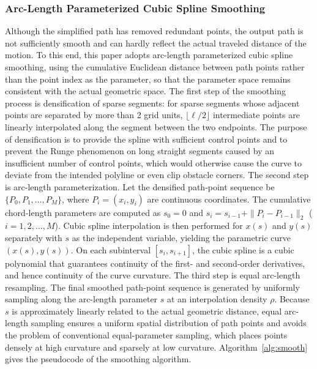 \documentclass[pdflatex,sn-basic,Numbered]{sn-jnl}
\begin{document}
\subsubsection{Arc-Length Parameterized Cubic Spline Smoothing}

Although the simplified path has removed redundant points, the output path is not sufficiently smooth and can hardly reflect the actual traveled distance of the motion. To this end, this paper adopts arc-length parameterized cubic spline smoothing, using the cumulative Euclidean distance between path points rather than the point index as the parameter, so that the parameter space remains consistent with the actual geometric space. The first step of the smoothing process is densification of sparse segments: for sparse segments whose adjacent points are separated by more than 2 grid units, $\lfloor \ell / 2 \rfloor$ intermediate points are linearly interpolated along the segment between the two endpoints. The purpose of densification is to provide the spline with sufficient control points and to prevent the Runge phenomenon on long straight segments caused by an insufficient number of control points, which would otherwise cause the curve to deviate from the intended polyline or even clip obstacle corners. The second step is arc-length parameterization. Let the densified path-point sequence be $\{P_0, P_1, \ldots, P_M\}$, where $P_i = (x_i, y_i)$ are continuous coordinates. The cumulative chord-length parameters are computed as $s_0 = 0$ and $s_i = s_{i-1} + \|P_i - P_{i-1}\|_2$ ($i = 1, 2, \ldots, M$). Cubic spline interpolation is then performed for $x(s)$ and $y(s)$ separately with $s$ as the independent variable, yielding the parametric curve $(x(s), y(s))$. On each subinterval $[s_i, s_{i+1}]$, the cubic spline is a cubic polynomial that guarantees continuity of the first- and second-order derivatives, and hence continuity of the curve curvature. The third step is equal arc-length resampling. The final smoothed path-point sequence is generated by uniformly sampling along the arc-length parameter $s$ at an interpolation density $\rho$. Because $s$ is approximately linearly related to the actual geometric distance, equal arc-length sampling ensures a uniform spatial distribution of path points and avoids the problem of conventional equal-parameter sampling, which places points densely at high curvature and sparsely at low curvature. Algorithm~\ref{alg:smooth} gives the pseudocode of the smoothing algorithm.
\end{document}
